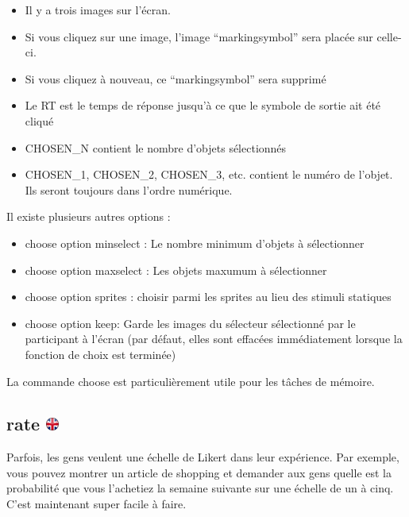 \documentclass[
]{book}
\providecommand{\tightlist}{%
  \setlength{\itemsep}{0pt}\setlength{\parskip}{0pt}}
\begin{document}
\begin{itemize}
\tightlist
\item
  Il y a trois images sur l'écran.
\item
  Si vous cliquez sur une image, l'image ``markingsymbol'' sera placée
  sur celle-ci.
\item
  Si vous cliquez à nouveau, ce ``markingsymbol'' sera supprimé
\item
  Le RT est le temps de réponse jusqu'à ce que le symbole de sortie ait
  été cliqué
\item
  CHOSEN\_N contient le nombre d'objets sélectionnés
\item
  CHOSEN\_1, CHOSEN\_2, CHOSEN\_3, etc. contient le numéro de l'objet.
  Ils seront toujours dans l'ordre numérique.
\end{itemize}

Il existe plusieurs autres options :

\begin{itemize}
\tightlist
\item
  choose option minselect : Le nombre minimum d'objets à sélectionner
\item
  choose option maxselect : Les objets maxumum à sélectionner
\item
  choose option sprites : choisir parmi les sprites au lieu des stimuli
  statiques
\item
  choose option keep: Garde les images du sélecteur sélectionné par le
  participant à l'écran (par défaut, elles sont effacées immédiatement
  lorsque la fonction de choix est terminée)
\end{itemize}

La commande choose est particulièrement utile pour les tâches de
mémoire.

\hypertarget{rate}{%
\subsection[rate ]{\texorpdfstring{rate
\href{https://www.psytoolkit.org/doc3.2.0/syntax.html\#task-rate}{\protect\includegraphics{img/ukflag.png}}}{rate }}\label{rate}}

Parfois, les gens veulent une échelle de Likert dans leur expérience.
Par exemple, vous pouvez montrer un article de shopping et demander aux
gens quelle est la probabilité que vous l'achetiez la semaine suivante
sur une échelle de un à cinq. C'est maintenant super facile à faire.
\end{document}
